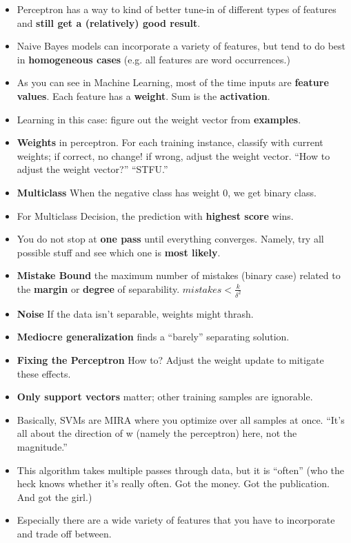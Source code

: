 \documentclass[twocolumn]{article}
\begin{document}
\begin{itemize}
\item Perceptron has a way to kind of better tune-in of different
  types of features and \textbf{still get a (relatively) good
    result}. 
\item Naive Bayes models can incorporate a variety of features, but
  tend to do best in \textbf{homogeneous cases} (e.g. all features are
  word occurrences.)
\item As you can see in Machine Learning, most of the time
  inputs are \textbf{feature values}. Each feature has a
  \textbf{weight}. Sum is the \textbf{activation}. 
\item Learning in this case: figure out the weight vector from
  \textbf{examples}. 
\item \textbf{Weights} in perceptron. For each training instance,
  classify with current weights; if correct, no change! if wrong,
  adjust the weight vector. ``How to adjust the weight vector?''
  ``STFU.'' 
\item \textbf{Multiclass} When the negative class has weight $0$, we
  get binary class.
\item For Multiclass Decision, the prediction with \textbf{highest
    score} wins.
\item You do not stop at \textbf{one pass} until everything
  converges. Namely, try all possible stuff and see which one is
  \textbf{most likely}.
\item \textbf{Mistake Bound} the maximum number of mistakes (binary
  case) related to the \textbf{margin} or \textbf{degree} of
  separability. $mistakes < \frac{k}{\delta^{2}}$
\item \textbf{Noise} If the data isn't separable, weights might
  thrash. 
\item \textbf{Mediocre generalization} finds a ``barely'' separating
  solution. 
\item \textbf{Fixing the Perceptron} How to? Adjust the weight update
  to mitigate these effects.
\item \textbf{Only support vectors} matter; other training samples
  are ignorable.
\item Basically, SVMs are MIRA where you optimize over all samples at
  once. ``It's all about the direction of w (namely the perceptron)
  here, not the magnitude.''
\item This algorithm takes multiple passes through data, but it is
  ``often'' (who the heck knows whether it's really often. Got the
  money. Got the publication. And got the girl.)
\item Especially there are a wide variety of features that you have to
  incorporate and trade off between.
\end{itemize}
\end{document}
